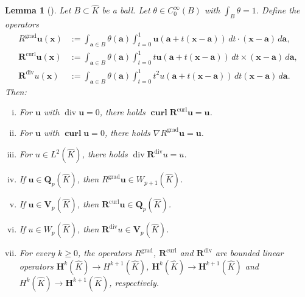 \documentclass{article}
\newtheorem{lemma}[theorem]{Lemma}
\begin{document}
\begin{lemma}
[\!]\label{lemma:mcintosh} Let $B\subset\widehat{K}$ be a ball. Let $\theta\in C_{0}^{\infty}(B)$ with $\int_{B}%
\theta=1$. Define the operators
\begin{align*}
{R}^{\operatorname*{grad}}{\mathbf{u}}(\mathbf{x})  &  :=\int_{{\mathbf{a}}\in B} \theta(\mathbf{a})%
\int_{t=0}^{1}{\mathbf{u}}(\mathbf{a}+t(\mathbf{x}-{\mathbf{a}}))\,dt\cdot(\mathbf{x}-{\mathbf{a}%
})\,d{\mathbf{a}},\\
{\mathbf{R}}^{\operatorname*{curl}}{\mathbf{u}}(\mathbf{x})  &  :=\int_{{\mathbf{a}}\in
B} \theta(\mathbf{a}) \int_{t=0}^{1}t{\mathbf{u}}(\mathbf{a}+t(\mathbf{x}-{\mathbf{a}}))\,dt\times(\mathbf{x}-{\mathbf{a}%
})\,d{\mathbf{a}},\\
{\mathbf{R}}^{\operatorname*{div}}{u}(\mathbf{x})  &  :=\int_{{\mathbf{a}}\in B} \theta(\mathbf{a})%
\int_{t=0}^{1}t^2 u(\mathbf{a}+t(\mathbf{x}-{\mathbf{a}}))\,dt (\mathbf{x}-{\mathbf{a}%
})\,d{\mathbf{a}}.
\end{align*}
Then:

\begin{enumerate}
[(i)]

\item 
\label{item:lemma:mcintosh-i}
For ${\mathbf{u}}$ with $\operatorname*{div}{\mathbf{u}}=0$, there holds
$\operatorname*{\mathbf{curl}}{\mathbf{R}}^{\operatorname*{curl}}{\mathbf{u}%
}={\mathbf{u}}$.

\item 
\label{item:lemma:mcintosh-ii}
For ${\mathbf{u}}$ with $\operatorname*{\mathbf{curl}}{\mathbf{u}}=0$, there
holds $\nabla{R}^{\operatorname*{grad}}{\mathbf{u}}={\mathbf{u}}$.

\item 
\label{item:lemma:mcintosh-iii}
For $u\in L^2(\widehat{K})$, there holds $\operatorname*{div}{\mathbf{R}}^{\operatorname*{div}}u=u$.

\item 
\label{item:lemma:mcintosh-iv}
If ${\mathbf{u}}\in\mathbf{Q}_p(\widehat{K})$,
then ${R}^{\operatorname*{grad}}{\mathbf{u}}\in W_{p+1}(\widehat{K})$.

\item 
\label{item:lemma:mcintosh-v}
If ${\mathbf{u}}\in\mathbf{V}_{p}(\widehat{K})$, then ${\mathbf{R}}^{\operatorname*{curl}%
}{\mathbf{u}}\in\mathbf{Q}_p(\widehat{K})$.

\item 
\label{item:lemma:mcintosh-vi}
If $u\in W_p(\widehat{K})$, then $\mathbf{R}^{\operatorname*{div}}u\in \mathbf{V}_p(\widehat{K})$.

\item 
\label{item:lemma:mcintosh-vii}
For every $k\geq0$, the operators ${R}^{\operatorname*{grad}}$, 
${\mathbf{R}}^{\operatorname*{curl}}$ and ${\mathbf{R}}^{\operatorname*{div}}$ are bounded linear operators
$\mathbf{H}^{k}(\widehat{K})\rightarrow H^{k+1}(\widehat{K})$, $\mathbf{H}^{k}(\widehat{K})\rightarrow \mathbf{H}^{k+1}(\widehat{K})$ and $H^{k}(\widehat{K})\rightarrow \mathbf{H}^{k+1}(\widehat{K})$, respectively.
\end{enumerate}
\end{lemma}
\end{document}

